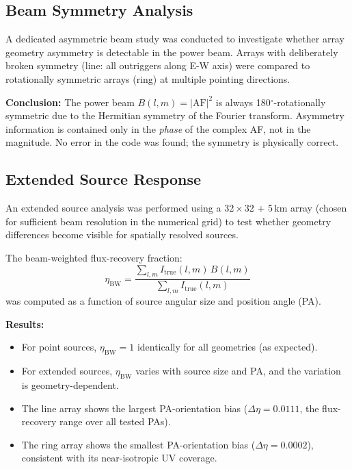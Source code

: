 \documentclass[12pt,a4paper]{article}
\begin{document}
\subsection{Beam Symmetry Analysis}

A dedicated asymmetric beam study was conducted to investigate whether array
geometry asymmetry is detectable in the power beam.
Arrays with deliberately broken symmetry (line: all outriggers along E-W axis)
were compared to rotationally symmetric arrays (ring) at multiple pointing
directions.

\textbf{Conclusion:} The power beam $B(l,m) = |\mathrm{AF}|^2$ is always
180$^\circ$-rotationally symmetric due to the Hermitian symmetry of the
Fourier transform.
Asymmetry information is contained only in the \emph{phase} of the complex AF,
not in the magnitude.
No error in the code was found; the symmetry is physically correct.

\subsection{Extended Source Response}

An extended source analysis was performed using a 32\,$\times$\,32 + 5\,km
array (chosen for sufficient beam resolution in the numerical grid) to test
whether geometry differences become visible for spatially resolved sources.

The beam-weighted flux-recovery fraction:
\begin{equation}
  \eta_\mathrm{BW} = \frac{\sum_{l,m} I_\mathrm{true}(l,m)\,B(l,m)}
                           {\sum_{l,m} I_\mathrm{true}(l,m)}
\end{equation}
was computed as a function of source angular size and position angle (PA).

\textbf{Results:}
\begin{itemize}
  \item For point sources, $\eta_\mathrm{BW} = 1$ identically for all
    geometries (as expected).
  \item For extended sources, $\eta_\mathrm{BW}$ varies with source size and PA,
    and the variation is geometry-dependent.
  \item The line array shows the largest PA-orientation bias
    ($\Delta\eta = 0.0111$, the flux-recovery range over all tested PAs).
  \item The ring array shows the smallest PA-orientation bias
    ($\Delta\eta = 0.0002$), consistent with its near-isotropic UV coverage.
\end{itemize}
\end{document}

